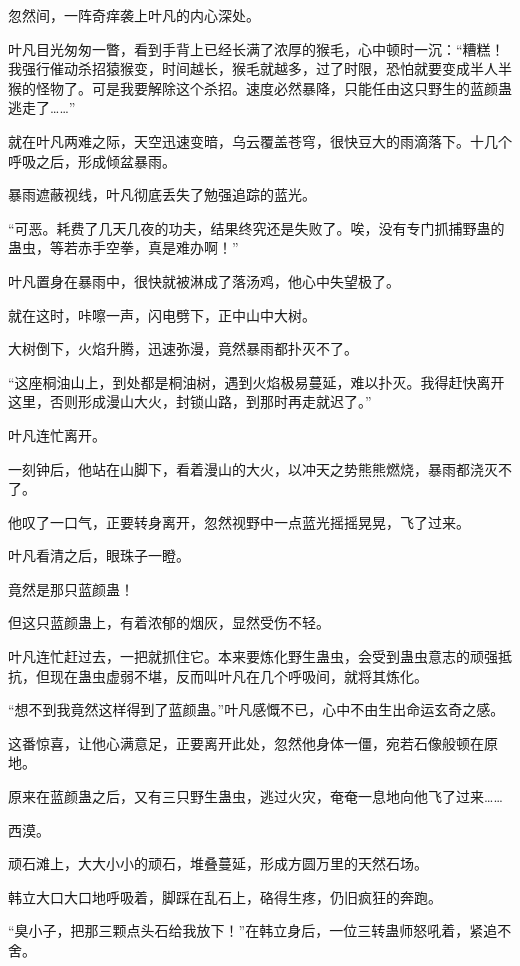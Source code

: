 \begin{this_body}
忽然间，一阵奇痒袭上叶凡的内心深处。

叶凡目光匆匆一瞥，看到手背上已经长满了浓厚的猴毛，心中顿时一沉：“糟糕！我强行催动杀招猿猴变，时间越长，猴毛就越多，过了时限，恐怕就要变成半人半猴的怪物了。可是我要解除这个杀招。速度必然暴降，只能任由这只野生的蓝颜蛊逃走了……”

就在叶凡两难之际，天空迅速变暗，乌云覆盖苍穹，很快豆大的雨滴落下。十几个呼吸之后，形成倾盆暴雨。

暴雨遮蔽视线，叶凡彻底丢失了勉强追踪的蓝光。

“可恶。耗费了几天几夜的功夫，结果终究还是失败了。唉，没有专门抓捕野蛊的蛊虫，等若赤手空拳，真是难办啊！”

叶凡置身在暴雨中，很快就被淋成了落汤鸡，他心中失望极了。

就在这时，咔嚓一声，闪电劈下，正中山中大树。

大树倒下，火焰升腾，迅速弥漫，竟然暴雨都扑灭不了。

“这座桐油山上，到处都是桐油树，遇到火焰极易蔓延，难以扑灭。我得赶快离开这里，否则形成漫山大火，封锁山路，到那时再走就迟了。”

叶凡连忙离开。

一刻钟后，他站在山脚下，看着漫山的大火，以冲天之势熊熊燃烧，暴雨都浇灭不了。

他叹了一口气，正要转身离开，忽然视野中一点蓝光摇摇晃晃，飞了过来。

叶凡看清之后，眼珠子一瞪。

竟然是那只蓝颜蛊！

但这只蓝颜蛊上，有着浓郁的烟灰，显然受伤不轻。

叶凡连忙赶过去，一把就抓住它。本来要炼化野生蛊虫，会受到蛊虫意志的顽强抵抗，但现在蛊虫虚弱不堪，反而叫叶凡在几个呼吸间，就将其炼化。

“想不到我竟然这样得到了蓝颜蛊。”叶凡感慨不已，心中不由生出命运玄奇之感。

这番惊喜，让他心满意足，正要离开此处，忽然他身体一僵，宛若石像般顿在原地。

原来在蓝颜蛊之后，又有三只野生蛊虫，逃过火灾，奄奄一息地向他飞了过来……

西漠。

顽石滩上，大大小小的顽石，堆叠蔓延，形成方圆万里的天然石场。

韩立大口大口地呼吸着，脚踩在乱石上，硌得生疼，仍旧疯狂的奔跑。

“臭小子，把那三颗点头石给我放下！”在韩立身后，一位三转蛊师怒吼着，紧追不舍。


\end{this_body}
